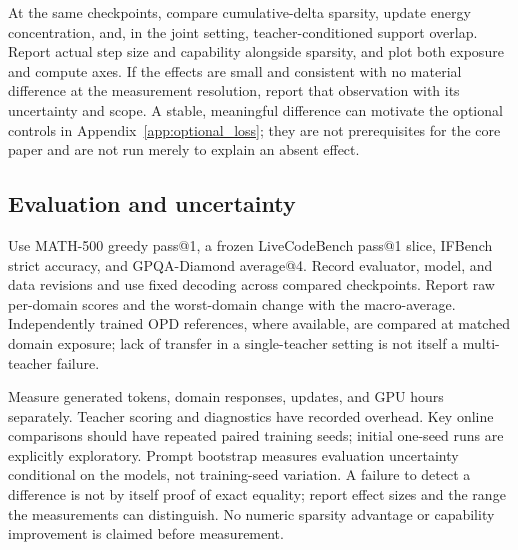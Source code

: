 At the same checkpoints, compare cumulative-delta sparsity, update
energy concentration, and, in the joint setting, teacher-conditioned
support overlap. Report actual step size and capability alongside
sparsity, and plot both exposure and compute axes. If the effects are
small and consistent with no material difference at the measurement
resolution, report that observation with its uncertainty and scope.
A stable, meaningful difference can motivate the optional controls in
Appendix~\ref{app:optional_loss}; they are not prerequisites for the
core paper and are not run merely to explain an absent effect.

\subsection{Evaluation and uncertainty}

Use MATH-500 greedy pass@1, a frozen LiveCodeBench pass@1 slice,
IFBench strict accuracy, and GPQA-Diamond average@4. Record evaluator,
model, and data revisions and use fixed decoding across compared
checkpoints. Report raw per-domain scores and the worst-domain change
with the macro-average. Independently trained OPD references, where
available, are compared at matched domain exposure; lack of transfer
in a single-teacher setting is not itself a multi-teacher failure.

Measure generated tokens, domain responses, updates, and GPU hours
separately. Teacher scoring and diagnostics have recorded overhead.
Key online comparisons should have repeated paired training seeds;
initial one-seed runs are explicitly exploratory. Prompt bootstrap
measures evaluation uncertainty conditional on the models, not
training-seed variation. A failure to detect a difference is not by
itself proof of exact equality; report effect sizes and the range the
measurements can distinguish. No numeric sparsity advantage or
capability improvement is claimed before measurement.

